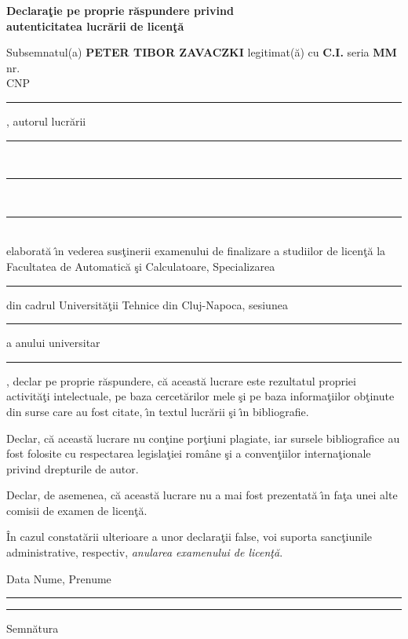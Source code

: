 \documentclass[12pt,a4paper,twoside]{report}
\newcommand{\uline}[1]{\rule[0pt]{#1}{0.4pt}}
\begin{document}
\begin{center}
{\bf
Declara\c{t}ie pe proprie r\u{a}spundere privind\\ 
autenticitatea lucr\u{a}rii de licen\c{t}\u{a}}
\end{center}
\vspace{1cm}



Subsemnatul(a) \textbf{PETER TIBOR ZAVACZKI} legitimat(\u{a}) cu \textbf{C.I.} seria \textbf{MM} nr. \textbf{}\\
CNP \uline{9cm}, autorul lucr\u{a}rii \uline{2.8cm}\\
\uline{16cm}\\
\uline{16cm}\\
elaborat\u{a} \^{\i}n vederea sus\c{t}inerii examenului de finalizare a studiilor de licen\c{t}\u{a} la Facultatea de Automatic\u{a} \c{s}i Calculatoare, Specializarea \uline{7cm} din cadrul Universit\u{a}\c{t}ii Tehnice din Cluj-Napoca, sesiunea \uline{4cm} a anului universitar \uline{3cm}, declar pe proprie r\u{a}spundere, c\u{a} aceast\u{a} lucrare este rezultatul propriei activit\u{a}\c{t}i intelectuale, pe baza cercet\u{a}rilor mele \c{s}i pe baza informa\c{t}iilor ob\c{t}inute din surse care au fost citate, \^{\i}n textul lucr\u{a}rii \c{s}i \^{\i}n bibliografie.

Declar, c\u{a} aceast\u{a} lucrare nu con\c{t}ine por\c{t}iuni plagiate, iar sursele bibliografice au fost folosite cu 
respectarea legisla\c{t}iei rom\^{a}ne \c{s}i a conven\c{t}iilor interna\c{t}ionale privind drepturile de autor.

Declar, de asemenea, c\u{a} aceast\u{a} lucrare nu a mai fost prezentat\u{a} \^{\i}n fa\c{t}a unei alte comisii de examen de licen\c{t}\u{a}.

\^{I}n cazul constat\u{a}rii ulterioare a unor declara\c{t}ii false, voi suporta sanc\c{t}iunile administrative, respectiv, \emph{anularea examenului de licen\c{t}\u{a}}.

\vspace{1.5cm}

Data \hspace{8cm} Nume, Prenume

\vspace{0.5cm}

\uline{3cm} \hspace{5cm} \uline{5cm}

\vspace{0.5cm}
\hspace{9.4cm}Semn\u{a}tura
\end{document}
